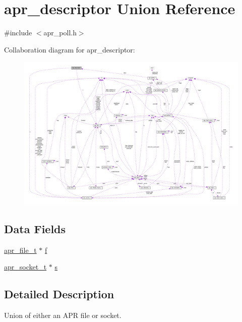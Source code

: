 \hypertarget{unionapr__descriptor}{}\section{apr\+\_\+descriptor Union Reference}
\label{unionapr__descriptor}


{\ttfamily \#include $<$apr\+\_\+poll.\+h$>$}



Collaboration diagram for apr\+\_\+descriptor\+:
\nopagebreak
\begin{figure}[H]
\begin{center}
\leavevmode
\includegraphics[width=350pt]{unionapr__descriptor__coll__graph}
\end{center}
\end{figure}
\subsection*{Data Fields}
\begin{DoxyCompactItemize}
\item 
\hyperlink{structapr__file__t}{apr\+\_\+file\+\_\+t} $\ast$ \hyperlink{unionapr__descriptor_a69d605f2bb33b05ceedb3d95b744ca7e}{f}
\item 
\hyperlink{structapr__socket__t}{apr\+\_\+socket\+\_\+t} $\ast$ \hyperlink{unionapr__descriptor_a39a15be8be084afadfa173810b346f6c}{s}
\end{DoxyCompactItemize}


\subsection{Detailed Description}
Union of either an A\+PR file or socket. 

